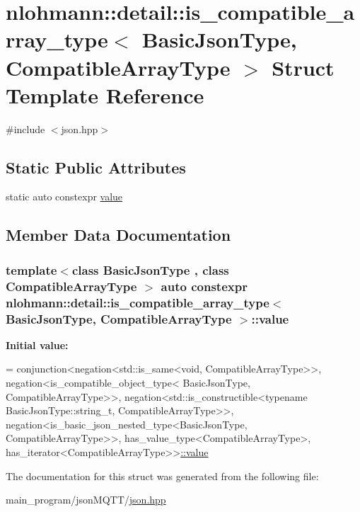 \hypertarget{structnlohmann_1_1detail_1_1is__compatible__array__type}{}\section{nlohmann\+:\+:detail\+:\+:is\+\_\+compatible\+\_\+array\+\_\+type$<$ Basic\+Json\+Type, Compatible\+Array\+Type $>$ Struct Template Reference}
\label{structnlohmann_1_1detail_1_1is__compatible__array__type}


{\ttfamily \#include $<$json.\+hpp$>$}

\subsection*{Static Public Attributes}
\begin{DoxyCompactItemize}
\item 
static auto constexpr \hyperlink{structnlohmann_1_1detail_1_1is__compatible__array__type_a01bc2274c22746bbb2cefd2acee8b572}{value}
\end{DoxyCompactItemize}


\subsection{Member Data Documentation}
\subsubsection[{\texorpdfstring{value}{value}}]{\setlength{\rightskip}{0pt plus 5cm}template$<$class Basic\+Json\+Type , class Compatible\+Array\+Type $>$ auto constexpr {\bf nlohmann\+::detail\+::is\+\_\+compatible\+\_\+array\+\_\+type}$<$ Basic\+Json\+Type, Compatible\+Array\+Type $>$\+::value\hspace{0.3cm}{\ttfamily [static]}}\hypertarget{structnlohmann_1_1detail_1_1is__compatible__array__type_a01bc2274c22746bbb2cefd2acee8b572}{}\label{structnlohmann_1_1detail_1_1is__compatible__array__type_a01bc2274c22746bbb2cefd2acee8b572}
{\bfseries Initial value\+:}
\begin{DoxyCode}
=
        conjunction<negation<std::is\_same<void, CompatibleArrayType>>,
        negation<is\_compatible\_object\_type<
        BasicJsonType, CompatibleArrayType>>,
        negation<std::is\_constructible<\textcolor{keyword}{typename} BasicJsonType::string\_t,
        CompatibleArrayType>>,
        negation<is\_basic\_json\_nested\_type<BasicJsonType, CompatibleArrayType>>,
        has\_value\_type<CompatibleArrayType>,
        has\_iterator<CompatibleArrayType>>\hyperlink{structnlohmann_1_1detail_1_1is__compatible__array__type_a01bc2274c22746bbb2cefd2acee8b572}{::value}
\end{DoxyCode}


The documentation for this struct was generated from the following file\+:\begin{DoxyCompactItemize}
\item 
main\+\_\+program/json\+M\+Q\+T\+T/\hyperlink{json_8hpp}{json.\+hpp}\end{DoxyCompactItemize}
